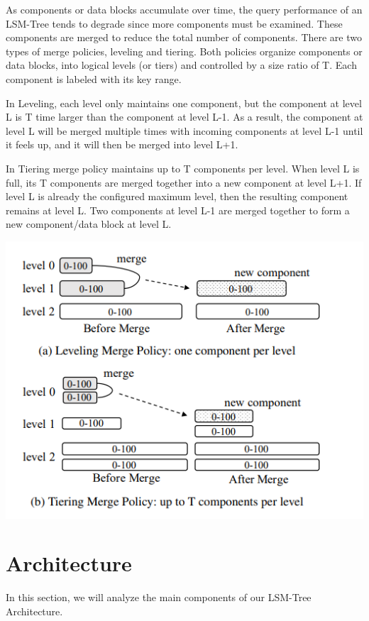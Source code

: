 \documentclass[sigconf]{acmart}
\begin{document}
    As components or data blocks accumulate over time, the query performance of an LSM-Tree tends to degrade since more components must be examined. These components are merged to reduce the total number of components. There are two types of merge policies, leveling and tiering. Both policies organize components or data blocks, into logical levels (or tiers) and controlled by a size ratio of T. Each component is labeled with its key range.

    In Leveling, each level only maintains one component, but the component at level L is T time larger than the component at level L-1. As a result, the component at level L will be merged multiple times with incoming components at level L-1 until it feels up, and it will then be merged into level L+1.

    In Tiering merge policy maintains up to T components per level. When level L is full, its T components are merged together into a new component at level L+1. If level L is already the configured maximum level, then the resulting component remains at level L. Two components at level L-1 are merged together to form a new component/data block at level L.

    \includegraphics[scale=0.85]{images/MergingStrategies.PNG}

    \section{Architecture}
    In this section, we will analyze the main components of our LSM-Tree Architecture.
\end{document}
